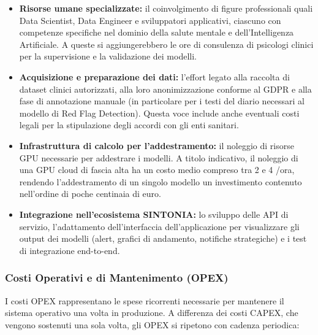 \begin{itemize}
    \item \textbf{Risorse umane specializzate:} il coinvolgimento di figure professionali quali Data Scientist, Data Engineer e sviluppatori applicativi, ciascuno con competenze specifiche nel dominio della salute mentale e dell'Intelligenza Artificiale. A queste si aggiungerebbero le ore di consulenza di psicologi clinici per la supervisione e la validazione dei modelli.

    \item \textbf{Acquisizione e preparazione dei dati:} l'effort legato alla raccolta di dataset clinici autorizzati, alla loro anonimizzazione conforme al GDPR e alla fase di annotazione manuale (in particolare per i testi del diario necessari al modello di Red Flag Detection). Questa voce include anche eventuali costi legali per la stipulazione degli accordi con gli enti sanitari.

    \item \textbf{Infrastruttura di calcolo per l'addestramento:} il noleggio di risorse GPU necessarie per addestrare i modelli. A titolo indicativo, il noleggio di una GPU cloud di fascia alta ha un costo medio compreso tra 2 e 4 \texteuro/ora, rendendo l'addestramento di un singolo modello un investimento contenuto nell'ordine di poche centinaia di euro.

    \item \textbf{Integrazione nell'ecosistema SINTONIA:} lo sviluppo delle API di servizio, l'adattamento dell'interfaccia dell'applicazione per visualizzare gli output dei modelli (alert, grafici di andamento, notifiche strategiche) e i test di integrazione end-to-end.
\end{itemize}

\subsubsection{Costi Operativi e di Mantenimento (OPEX)}
\label{subsubsec:opex}

I costi OPEX rappresentano le spese ricorrenti necessarie per mantenere il sistema operativo una volta in produzione. A differenza dei costi CAPEX, che vengono sostenuti una sola volta, gli OPEX si ripetono con cadenza periodica:

